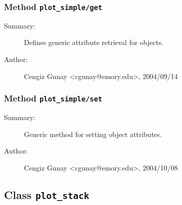 \subsubsection[Method \texttt{get}]{Method \texttt{plot\_simple/get}}%
%
\label{ref_plot_simple__get}%
\hypertarget{ref_plot_simple__get}{}%
\begin{description}
\item[Summary:]Defines generic attribute retrieval for objects.
%
%
%
%
%
%
%
\item[Author:]%
Cengiz Gunay <cgunay@emory.edu>, 2004/09/14%
\end{description}
\methodline%
\subsubsection[Method \texttt{set}]{Method \texttt{plot\_simple/set}}%
%
\label{ref_plot_simple__set}%
\hypertarget{ref_plot_simple__set}{}%
\begin{description}
\item[Summary:]Generic method for setting object attributes.
%
%
%
%
%
%
%
\item[Author:]%
Cengiz Gunay <cgunay@emory.edu>, 2004/10/08%
\end{description}
\methodline%
\subsection{Class \texttt{plot\_stack}}%
%
\label{ref_plot_stack}%
\hypertarget{ref_plot_stack}{}%
